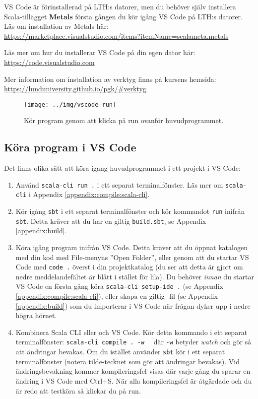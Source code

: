 VS Code är förinstallerad på LTH:s datorer, men du behöver själv installera Scala-tillägget \textbf{Metals} första gången du kör igång VS Code på LTH:s datorer. Läs om installation av Metals här: \\
\url{https://marketplace.visualstudio.com/items?itemName=scalameta.metals} 

Läs mer om hur du installerar VS Code på din egen dator här: \\\url{https://code.visualstudio.com}

Mer information om installation av verktyg finns på kursens hemsida: \\
\url{https://lunduniversity.github.io/pgk/#verktyg}

\begin{figure}
\centering
\texttt{[image: ../img/vscode-run]}
\caption{Kör program genom att klicka på \textsf{run} ovanför huvudprogrammet. \label{appendix-ide:vscode-run}}
\end{figure}

\subsection{Köra program i VS Code}

Det finns olika sätt att köra igång huvudprogrammet i ett projekt i VS Code:

\begin{enumerate}
  \item Använd \texttt{scala-cli run .} i ett separat terminalfönster. Läs mer om \texttt{scala-cli} i Appendix \ref{appendix:compile:scala-cli}.
  \item Kör igång \texttt{sbt} i ett separat terminalfönster och kör kommandot \texttt{run} inifrån \texttt{sbt}. Detta kräver att du har en giltig \texttt{build.sbt}, se Appendix \ref{appendix:build}.
  \item Köra igång program inifrån VS Code. Detta kräver att du öppnat katalogen med din kod med File-menyns ''Open Folder'', eller genom att du startar VS Code med \texttt{code .} överst i din projektkatalog (du ser att detta är gjort om nedre meddelandefältet är blått i stället för lila). Du behöver \textit{innan} du startar VS Code en första gång köra \texttt{scala-cli setup-ide .} (se Appendix \ref{appendix:compile:scala-cli}), eller skapa en giltig -fil (se Appendix \ref{appendix:build}) som du importerar i VS Code när frågan dyker upp i nedre högra hörnet.
  \item Kombinera Scala CLI eller  och VS Code. Kör detta kommando i ett separat terminalfönster: \texttt{scala-cli compile . -w}~~ där \texttt{-w} betyder \emph{watch} och gör så att ändringar bevakas. Om du istället använder \texttt{sbt} kör  i ett separat terminalfönster (notera tilde-tecknet som gör att ändringar bevakas). Vid ändringsbevakning kommer kompileringsfel visas där varje gång du sparar en ändring i VS Code med Ctrl+S. När alla kompileringsfel är åtgärdade och du är redo att testköra så klickar du på \textsf{run}.
\end{enumerate}

